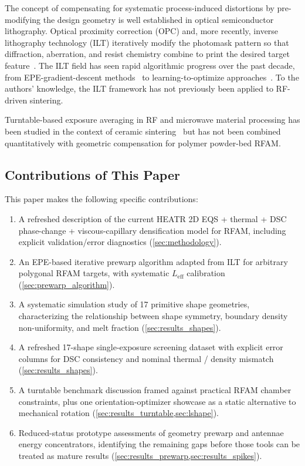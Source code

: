 \documentclass[5p,times]{elsarticle}
\newcommand{\Leff}{L_{\mathrm{eff}}}
\begin{document}
The concept of compensating for systematic process-induced distortions
by pre-modifying the design geometry is well established in optical
semiconductor lithography.  Optical proximity correction (OPC) and,
more recently, inverse lithography technology (ILT) iteratively modify
the photomask pattern so that diffraction, aberration, and resist
chemistry combine to print the desired target
feature~\cite{pang2021inverse,poonawala2007mask,chan2008initialization}.
The ILT field has seen rapid algorithmic progress over the past decade,
from EPE-gradient-descent methods~\cite{zhang2023fast} to
learning-to-optimize approaches~\cite{zhu2024l2o}.  To the authors'
knowledge, the ILT framework has not previously been applied to
RF-driven sintering.

Turntable-based exposure averaging in RF and microwave material
processing has been studied in the context of ceramic
sintering~\cite{RFceramic2023,ferdous2017rfheating} but has not been
combined quantitatively with geometric compensation for polymer
powder-bed RFAM.

\subsection{Contributions of This Paper}

This paper makes the following specific contributions:
\begin{enumerate}
\item A refreshed description of the current HEATR 2D EQS + thermal +
      DSC phase-change + viscous-capillary densification model for
      RFAM, including explicit validation/error diagnostics
      (\cref{sec:methodology}).
\item An EPE-based iterative prewarp algorithm adapted from ILT for
      arbitrary polygonal RFAM targets, with systematic $\Leff$
      calibration (\cref{sec:prewarp_algorithm}).
\item A systematic simulation study of 17 primitive shape geometries,
      characterizing the relationship between shape symmetry, boundary
      density non-uniformity, and melt fraction
      (\cref{sec:results_shapes}).
\item A refreshed 17-shape single-exposure screening dataset with
      explicit error columns for DSC consistency and nominal thermal /
      density mismatch (\cref{sec:results_shapes}).
\item A turntable benchmark discussion framed against practical RFAM
      chamber constraints, plus one orientation-optimizer showcase as a
      static alternative to mechanical rotation
      (\cref{sec:results_turntable,sec:lshape}).
\item Reduced-status prototype assessments of geometry prewarp and
      antennae energy concentrators, identifying the remaining gaps
      before those tools can be treated as mature results
      (\cref{sec:results_prewarp,sec:results_spikes}).
\end{enumerate}
\end{document}
